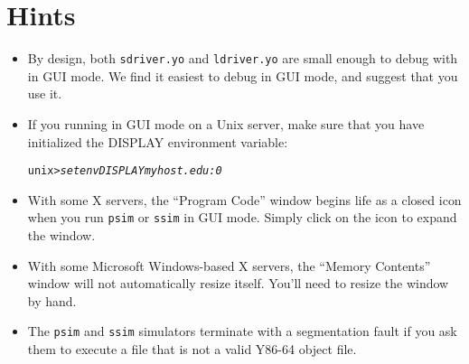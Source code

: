 \documentclass[11pt]{article}
\newenvironment{tty}%
{\small\begin{alltt}}%
{\end{alltt}}
\begin{document}
\section{Hints}

\begin{itemize}

\item By design, both \texttt{sdriver.yo} and \texttt{ldriver.yo}
are small enough to debug with in GUI mode. We find it
easiest to debug in GUI mode, and suggest that you use it.

\item If you running in GUI mode on a Unix server, make sure
that you have initialized the DISPLAY environment variable:
\begin{tty}
    unix> {\em setenv DISPLAY myhost.edu:0}
\end{tty}

\item With some X servers, the ``Program Code'' window begins life
as a closed icon when you run \texttt{psim} or \texttt{ssim} 
in GUI mode. Simply click on the icon to expand the window.

\item With some Microsoft 
Windows-based X servers, the ``Memory Contents'' window
will not automatically resize itself. You'll need to resize the window
by hand.

\item The \texttt{psim} and \texttt{ssim} simulators 
terminate with a segmentation fault if you ask them to execute a file
that is not a valid Y86-64 object file.

\end{itemize}
\end{document}
